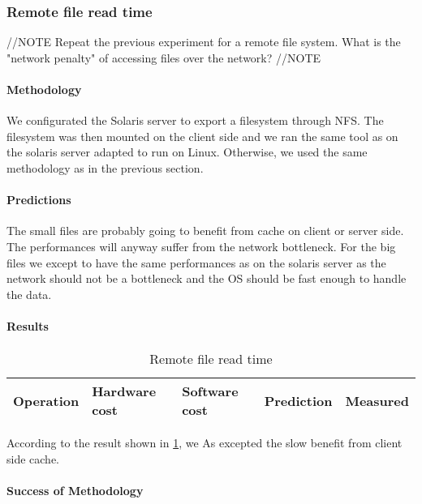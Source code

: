 \subsubsection{Remote file read time}
//NOTE
Repeat the previous experiment for a remote file system. What is the "network penalty" of accessing files over the network?
//NOTE

\paragraph{Methodology}
We configurated the Solaris server to export a filesystem through NFS.
The filesystem was then mounted on the client side and we ran the same tool as
on the solaris server adapted to run on Linux.
Otherwise, we used the same methodology as in the previous section.

\paragraph{Predictions}
The small files are probably going to benefit from cache on client or server
side.
The performances will anyway suffer from the network bottleneck.
For the big files we except to have the same performances as on the solaris
server as the network should not be a bottleneck and the OS should be fast
enough to handle the data.

\paragraph{Results}

\begin{table}[h]
\begin{center}
\begin{tabular}{| l | l | l | l | l |}
\hline
Operation & Hardware cost & Software cost & Prediction & Measured \\
\hline
\end{tabular}
\end{center}
\caption{Remote file read time\label{tab:remote-file-access}}
\end{table}

According to the result shown in \ref{tab:remote-file-access}, we
As excepted the slow benefit from client side cache.
\paragraph{Success of Methodology}




